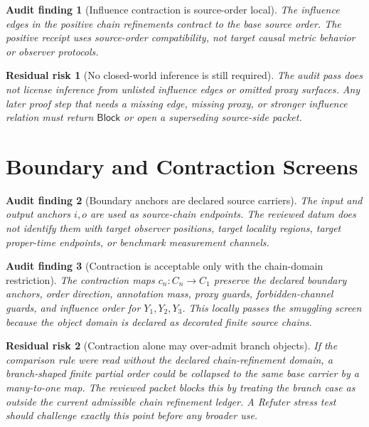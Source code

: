 \documentclass[11pt]{article}
\newcommand{\Block}{\mathsf{Block}}
\newtheorem{auditfinding}{Audit finding}
\newtheorem{residualrisk}{Residual risk}
\begin{document}
\begin{auditfinding}[Influence contraction is source-order local]
The influence edges in the positive chain refinements contract to the
base source order. The positive receipt uses source-order compatibility,
not target causal metric behavior or observer protocols.
\end{auditfinding}

\begin{residualrisk}[No closed-world inference is still required]
The audit pass does not license inference from unlisted influence edges
or omitted proxy surfaces. Any later proof step that needs a missing
edge, missing proxy, or stronger influence relation must return
\(\Block\) or open a superseding source-side packet.
\end{residualrisk}

\section{Boundary and Contraction Screens}

\begin{auditfinding}[Boundary anchors are declared source carriers]
The input and output anchors \(i,o\) are used as source-chain endpoints.
The reviewed datum does not identify them with target observer positions,
target locality regions, target proper-time endpoints, or benchmark
measurement channels.
\end{auditfinding}

\begin{auditfinding}[Contraction is acceptable only with the chain-domain restriction]
The contraction maps \(c_{n}:C_{n}\to C_{1}\) preserve the declared
boundary anchors, order direction, annotation mass, proxy guards,
forbidden-channel guards, and influence order for \(Y_{1},Y_{2},Y_{3}\).
This locally passes the smuggling screen because the object domain is
declared as decorated finite source chains.
\end{auditfinding}

\begin{residualrisk}[Contraction alone may over-admit branch objects]
If the comparison rule were read without the declared chain-refinement
domain, a branch-shaped finite partial order could be collapsed to the
same base carrier by a many-to-one map. The reviewed packet blocks this
by treating the branch case as outside the current admissible chain
refinement ledger. A Refuter stress test should challenge exactly this
point before any broader use.
\end{residualrisk}
\end{document}
